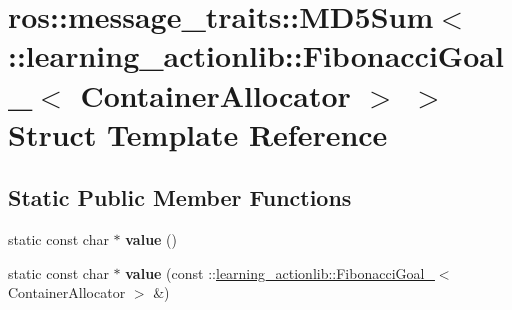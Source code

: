 \hypertarget{structros_1_1message__traits_1_1MD5Sum_3_01_1_1learning__actionlib_1_1FibonacciGoal___3_01ContainerAllocator_01_4_01_4}{}\section{ros\+:\+:message\+\_\+traits\+:\+:M\+D5\+Sum$<$ \+:\+:learning\+\_\+actionlib\+:\+:Fibonacci\+Goal\+\_\+$<$ Container\+Allocator $>$ $>$ Struct Template Reference}
\label{structros_1_1message__traits_1_1MD5Sum_3_01_1_1learning__actionlib_1_1FibonacciGoal___3_01ContainerAllocator_01_4_01_4}
\subsection*{Static Public Member Functions}
\begin{DoxyCompactItemize}
\item 
\mbox{\label{structros_1_1message__traits_1_1MD5Sum_3_01_1_1learning__actionlib_1_1FibonacciGoal___3_01ContainerAllocator_01_4_01_4_a3263fe58473a725123282d946ead3379}} 
static const char $\ast$ {\bfseries value} ()
\item 
\mbox{\label{structros_1_1message__traits_1_1MD5Sum_3_01_1_1learning__actionlib_1_1FibonacciGoal___3_01ContainerAllocator_01_4_01_4_a4e467568d06f9a95439ffeee5ba272ee}} 
static const char $\ast$ {\bfseries value} (const \+::\hyperlink{structlearning__actionlib_1_1FibonacciGoal__}{learning\+\_\+actionlib\+::\+Fibonacci\+Goal\+\_\+}$<$ Container\+Allocator $>$ \&)
\end{DoxyCompactItemize}
